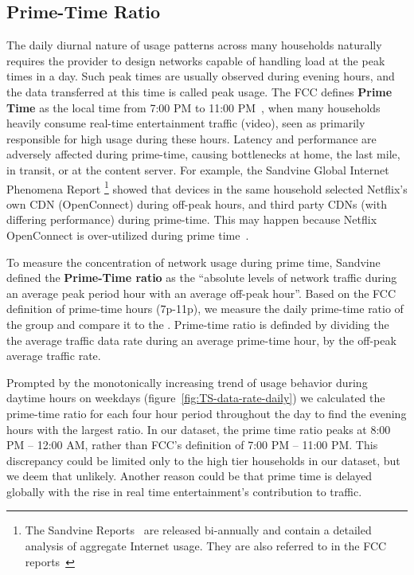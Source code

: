 \subsection{Prime-Time Ratio} \label{subsec:primetime}

The daily diurnal nature of usage patterns across many
households naturally requires the provider to design networks capable of handling 
load at the peak times in a day. Such peak times are usually observed during
evening hours, and the data transferred at this time is called peak usage.
The FCC defines \textbf{Prime Time} as the local time from 7:00 PM to 11:00
PM~\cite{fcc2014measuring-broadband}, when many
households heavily consume real-time entertainment traffic (video), seen as primarily
responsible for high usage during these hours. Latency and performance are adversely
affected during prime-time, causing bottlenecks at home, the last mile, in
transit, or at the content server. For example, the Sandvine Global
Internet Phenomena Report \footnote{The Sandvine Reports ~\cite{sandvine20141h,
sandvine20142h}are released bi-annually and
contain a detailed analysis of aggregate Internet usage. They are also referred
to in the FCC reports~\cite{fcc2015progress-report, fcc2014measuring-broadband,
fcc2014progress-report}} showed that devices in the same household selected Netflix's
own CDN (OpenConnect) during off-peak hours, and third party CDNs (with differing
performance) during prime-time. This may happen because Netflix OpenConnect is over-utilized
during prime time~\cite{sandvine20141h}.

To measure the concentration of network usage during prime time,
Sandvine defined the \textbf{Prime-Time ratio} as the ``absolute levels of network traffic
during an average peak period hour with an average off-peak hour''. Based on the FCC
definition of prime-time hours (7p-11p), we measure the daily prime-time ratio of the \control{} group and compare it to the \treatment{}. Prime-time ratio is definded by dividing the the average traffic data rate during an average prime-time hour, by the off-peak average traffic rate.

Prompted by the monotonically increasing trend of usage behavior during daytime hours on
weekdays (figure~\ref{fig:TS-data-rate-daily})
we calculated the prime-time ratio for each four hour period throughout the day
to find the evening hours with the largest ratio.
In our dataset, the prime time ratio peaks at 8:00 PM -- 12:00 AM,
rather than FCC's definition of 7:00 PM -- 11:00 PM. This discrepancy could be limited
only to the high tier households in our dataset, but we deem that unlikely.
Another reason could be that prime time is delayed globally with the rise in real
time entertainment's contribution to traffic.

